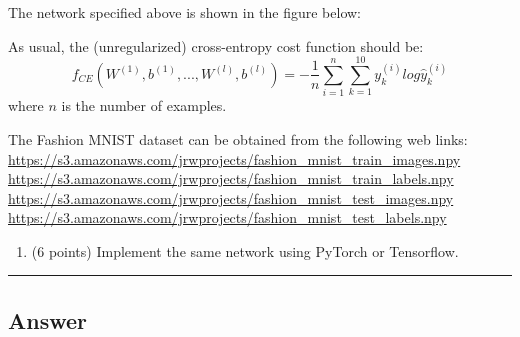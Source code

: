 \documentclass[
  letterpaper,
  DIV=11,
  numbers=noendperiod]{scrartcl}
\providecommand{\tightlist}{%
  \setlength{\itemsep}{0pt}\setlength{\parskip}{0pt}}\usepackage{longtable,booktabs,array}
\begin{document}
The network specified above is shown in the figure below:

As usual, the (unregularized) cross-entropy cost function should be:
\[f_{CE}(W^{(1)},b^{(1)},...,W^{(l)},b^{(l)})=-\frac{1}{n}\sum_{i=1}^{n}\sum_{k=1}^{10}y_{k}^{(i)}log\hat{y}_{k}^{(i)}\]
where \(n\) is the number of examples.

The Fashion MNIST dataset can be obtained from the following web links:
\url{https://s3.amazonaws.com/jrwprojects/fashion_mnist_train_images.npy}
\url{https://s3.amazonaws.com/jrwprojects/fashion_mnist_train_labels.npy}
\url{https://s3.amazonaws.com/jrwprojects/fashion_mnist_test_images.npy}
\url{https://s3.amazonaws.com/jrwprojects/fashion_mnist_test_labels.npy}

\begin{enumerate}
\def\labelenumi{\arabic{enumi}.}
\tightlist
\item
  (6 points) Implement the same network using PyTorch or Tensorflow.
\end{enumerate}

\begin{center}\rule{0.5\linewidth}{0.5pt}\end{center}

\subsection{Answer}\label{answer-3}
\end{document}
